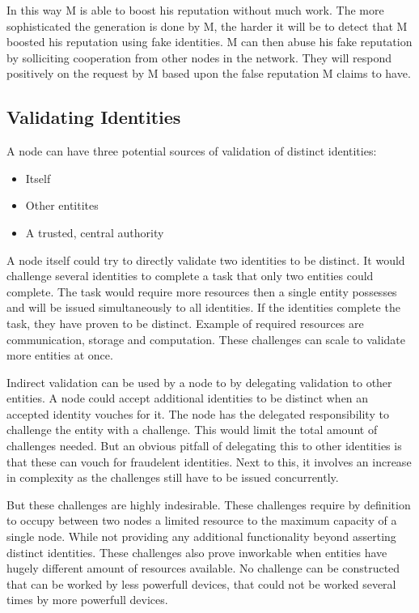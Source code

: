 In this way M is able to boost his reputation without much work.
The more sophisticated the generation is done by M,
the harder it will be to detect that M boosted his reputation using fake identities.
M can then abuse his fake reputation by solliciting cooperation from other nodes in the network.
They will respond positively on the request by M based upon the false reputation M claims to have.

\subsection{Validating Identities}
A node can have three potential sources of validation of distinct identities:
\begin{itemize}
\item Itself
\item Other entitites
\item A trusted, central authority
\end{itemize}

A node itself could try to directly validate two identities to be distinct.
It would challenge several identities to complete a task that only two entities could complete.
The task would require more resources then a single entity possesses and will be issued simultaneously to all identities.
If the identities complete the task, they have proven to be distinct.
Example of required resources are communication, storage and computation.
These challenges can scale to validate more entities at once.

Indirect validation can be used by a node to by delegating validation to other entities.
A node could accept additional identities to be distinct when an accepted identity vouches for it.
The node has the delegated responsibility to challenge the entity with a challenge.
This would limit the total amount of challenges needed.
But an obvious pitfall of delegating this to other identities is that these can vouch for fraudelent identities.
Next to this, it involves an increase in complexity as the challenges still have to be issued concurrently.

But these challenges are highly indesirable.
These challenges require by definition to occupy between two nodes a limited resource to the maximum capacity of a single node.
While not providing any additional functionality beyond asserting distinct identities.
These challenges also prove inworkable when entities have hugely different amount of resources available.
No challenge can be constructed that can be worked by less powerfull devices,
that could not be worked several times by more powerfull devices.


